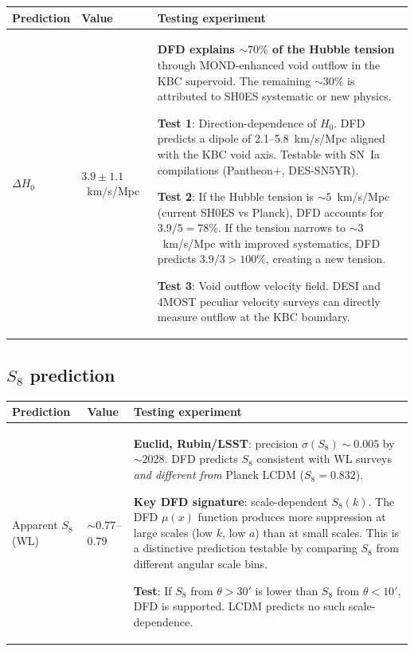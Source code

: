 \documentclass[11pt]{article}
\newcommand{\Hzero}{H_0}
\newcommand{\mufd}{\mu}
\begin{document}
\begin{table}[H]
\centering
\begin{tabular}{p{3cm}p{3cm}p{6cm}}
\toprule
\textbf{Prediction} & \textbf{Value} & \textbf{Testing experiment} \\
\midrule
$\Delta\Hzero$ & $3.9 \pm 1.1$~km/s/Mpc &
  \textbf{DFD explains $\sim 70\%$ of the Hubble tension} through
  MOND-enhanced void outflow in the KBC supervoid. The remaining $\sim 30\%$
  is attributed to SH0ES systematic or new physics.

  \textbf{Test 1}: Direction-dependence of $\Hzero$. DFD predicts a
  dipole of 2.1--5.8~km/s/Mpc aligned with the KBC void axis. Testable
  with SN~Ia compilations (Pantheon+, DES-SN5YR).

  \textbf{Test 2}: If the Hubble tension is $\sim 5$~km/s/Mpc (current
  SH0ES vs Planck), DFD accounts for $3.9/5 = 78\%$. If the tension
  narrows to $\sim 3$~km/s/Mpc with improved systematics, DFD predicts
  $3.9/3 > 100\%$, creating a new tension.

  \textbf{Test 3}: Void outflow velocity field. DESI and 4MOST peculiar
  velocity surveys can directly measure outflow at the KBC boundary. \\
\bottomrule
\end{tabular}
\end{table}

\subsection{$S_8$ prediction}

\begin{table}[H]
\centering
\begin{tabular}{p{3cm}p{3cm}p{6cm}}
\toprule
\textbf{Prediction} & \textbf{Value} & \textbf{Testing experiment} \\
\midrule
Apparent $S_8$ (WL) & $\sim 0.77$--$0.79$ &
  \textbf{Euclid, Rubin/LSST}: precision $\sigma(S_8) \sim 0.005$ by
  $\sim 2028$. DFD predicts $S_8$ consistent with WL surveys
  \emph{and different from} Planck LCDM ($S_8 = 0.832$).

  \textbf{Key DFD signature}: scale-dependent $S_8(k)$. The DFD
  $\mufd(x)$ function produces more suppression at large scales (low $k$,
  low $a$) than at small scales. This is a distinctive prediction
  testable by comparing $S_8$ from different angular scale bins.

  \textbf{Test}: If $S_8$ from $\theta > 30'$ is lower than $S_8$ from
  $\theta < 10'$, DFD is supported. LCDM predicts no such
  scale-dependence. \\
\bottomrule
\end{tabular}
\end{table}
\end{document}

